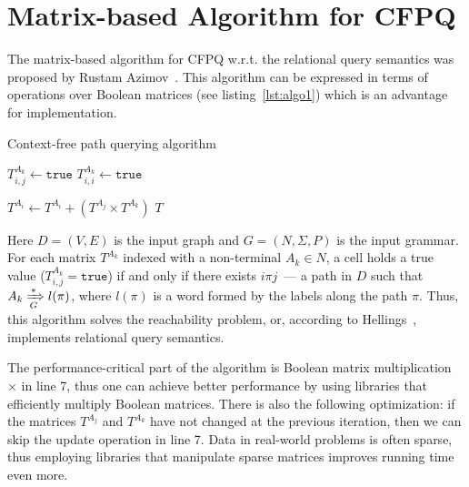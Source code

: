 \section{Matrix-based Algorithm for CFPQ}

The matrix-based algorithm for CFPQ w.r.t. the relational query semantics was proposed by Rustam Azimov~\cite{Azimov:2018:CPQ:3210259.3210264}.
This algorithm can be expressed in terms of operations over Boolean matrices (see listing~\ref{lst:algo1}) which is an advantage for implementation.
{\small
\begin{algorithm}
\begin{algorithmic}[1]
\caption{Context-free path querying algorithm}
\label{lst:algo1}
          {$T^{A_k}_{i,j} \gets \texttt{true}$}
    \EndFor
            {$T^{A_k}_{i,i} \gets \texttt{true}$}
        \EndFor
    \EndFor

          { $T^{A_i} \gets T^{A_i} + (T^{A_j} \times T^{A_k})$ } 
        \EndFor
    \EndWhile
\State \Return $T$
\EndFunction
\end{algorithmic}
\end{algorithm}
}

Here $D = (V, E)$ is the input graph and $G = (N,\Sigma,P)$ is the input grammar.
For each matrix $T^{A_k}$ indexed with a non-terminal $A_k \in N$, a cell holds a true value ($T^{A_k}_{i,j} = \texttt{true}$) if and only if there exists $i \pi j$~--- a path in $D$ such that $A_k \xRightarrow[G]{*} l(\pi) $, where $l(\pi)$ is a word formed by the labels along the path $\pi$.
Thus, this algorithm solves the reachability problem, or, according to Hellings~\cite{hellingsRelational}, implements relational query semantics.

The performance-critical part of the algorithm is Boolean matrix multiplication $\times$ in line 7, thus one can achieve better performance by using libraries that efficiently multiply Boolean matrices. 
There is also the following optimization: if the matrices $T^{A_j}$ and $T^{A_k}$ have not changed at the previous iteration, then we can skip the update operation in line 7.
Data in real-world problems is often sparse, thus employing libraries that manipulate sparse matrices improves running time even more. 
